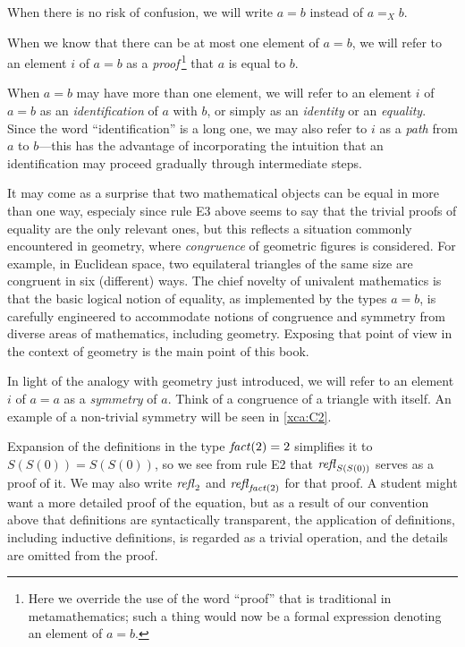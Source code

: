 When there is no risk of confusion, we will write $a=b$ instead of $a =_X b$.

When we know that there can be at most one element of $a=b$, we will refer to an element $i$ of $a=b$ as a {\em proof}\,\footnote{Here we override
  the use of the word ``proof'' that is traditional in metamathematics; such a thing would now be a formal expression denoting an
  element of $a=b$.} that $a$ is equal to $b$.

When $a=b$ may have more than one element, we will refer to an element $i$ of $a=b$ as an {\em identification} of $a$ with $b$, or simply as an
{\em identity} or an {\em equality}.  Since the word ``identification'' is a long one, we may also refer to $i$ as a {\em path} from $a$ to
$b$---this has the advantage of incorporating the intuition that an identification may proceed gradually through intermediate steps.

It may come as a surprise that two mathematical objects can be equal in more than one way, especialy since rule E3 above seems to say that the
trivial proofs of equality are the only relevant ones, but this reflects a situation commonly encountered in geometry, where {\em congruence} of
geometric figures is considered.  For example, in Euclidean space, two equilateral triangles of the same size are congruent in six (different)
ways.  The chief novelty of univalent mathematics is that the basic logical notion of equality, as implemented by the types $a=b$, is carefully
engineered to accommodate notions of congruence and symmetry from diverse areas of mathematics, including geometry.  Exposing that point of view
in the context of geometry is the main point of this book.

In light of the analogy with geometry just introduced, we will refer to an element $i$ of $a=a$ as a {\em symmetry} of $a$.  Think of a
congruence of a triangle with itself.  An example of a non-trivial symmetry will be seen in \cref{xca:C2}.

Expansion of the definitions in the type $\mathop{\mathit{fact}}(2)=2$ simplifies it to $S(S(0)) = S(S(0))$, so we see from rule E2 that $\mathop{{\it refl}_{S(S(0))}}$ serves
as a proof of it.  We may also write $\mathop{{\it refl}_{2}}$ and $\mathop{{\it refl}_{\mathop{\mathit{fact}}(2)}}$ for that proof.  A student might want a more detailed proof of the
equation, but as a result of our convention above that definitions are syntactically transparent, the application of definitions, including
inductive definitions, is regarded as a trivial operation, and the details are omitted from the proof.

